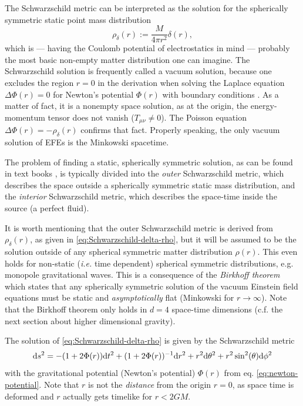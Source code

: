 \documentclass[12pt,a4paper]{report}
\numberwithin{equation}{chapter}
\begin{document}
The Schwarzschild metric can be interpreted as the solution for the spherically symmetric static point mass distribution
\begin{equation}\label{eq:Schwarzschild-delta-rho}
\rho_\delta(r) := \frac{M}{4\pi r^2} \delta(r),
\end{equation}
which is --- having the Coulomb potential of electrostatics in mind --- probably the most basic non-empty matter distribution one can imagine. The Schwarzschild solution is frequently called a vacuum solution, because one excludes the region $r=0$ in the derivation when solving the Laplace equation $\Delta \Phi(r) = 0$ for Newton's potential $\Phi(r)$ with boundary conditions \cite{Balasin93}. As a matter of fact, it is a nonempty space solution, as at the origin, the energy-momentum tensor does not vanish ($T_{\mu\nu} \neq 0$). The Poisson equation $\Delta \Phi(r) = - \rho_\delta(r)$ confirms that fact. Properly speaking, the only vacuum solution of EFEs is the Minkowski spacetime.

The problem of finding a static, spherically symmetric solution, as can be found in text books \cite{WaldGR, MTW}, is typically divided into the \emph{outer} Schwarz\-schild metric, which describes the space outside a spherically symmetric static mass distribution, and the \emph{interior} Schwarzschild metric, which describes the space-time inside the source (a perfect fluid).

It is worth mentioning that the outer Schwarzschild metric is derived from $\rho_\delta(r)$, as given in \eqref{eq:Schwarzschild-delta-rho}, but it will be assumed to be the solution outside of any spherical symmetric matter distribution $\rho(r)$. This even holds for non-static (\emph{i.e.} time dependent) spherical symmetric distributions, e.g. monopole gravitational waves. This is a consequence of the \emph{Birkhoff theorem} which states that any spherically symmetric solution of the vacuum Einstein field equations must be static and \emph{asymptotically} flat (Minkowski for $r\to\infty$). Note that the Birkhoff theorem only holds in $d=4$ space-time dimensions (c.f. the next section about higher dimensional gravity).

The solution of \eqref{eq:Schwarzschild-delta-rho} is given by the Schwarzschild metric
\begin{equation}\label{eq:metric-schwarzschild-1}
\mathrm{d} s^2 = - (1+2\Phi(r)) \mathrm{d} t^2 + (1+2\Phi(r))^{-1} \mathrm{d} r^2 + r^2\mathrm{d}\theta^2 + r^2\sin^2(\theta) \mathrm{d} \phi^2
\end{equation}
with the gravitational potential (Newton's potential) $\Phi(r)$ from eq. \eqref{eq:newton-potential}. Note that $r$ is not the \emph{distance} from the origin $r=0$, as space time is deformed and $r$ actually gets timelike for $r<2GM$.
\end{document}
